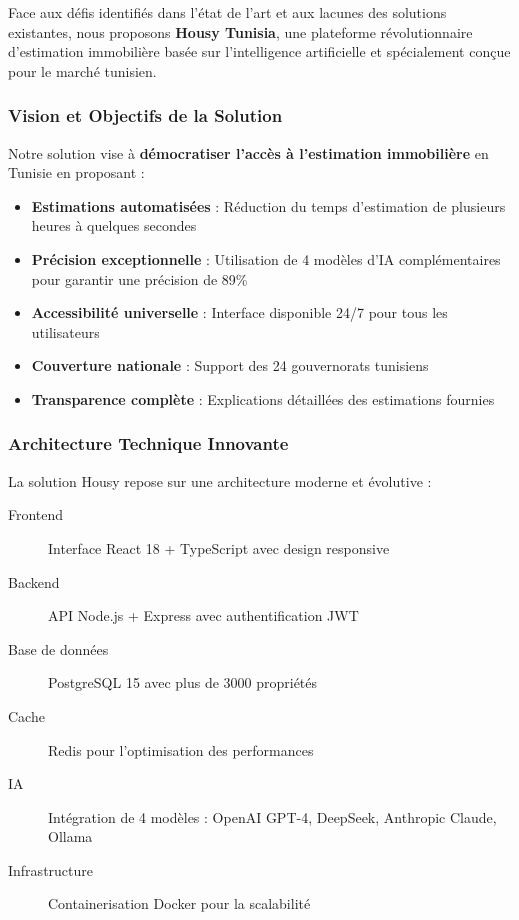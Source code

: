 Face aux défis identifiés dans l'état de l'art et aux lacunes des solutions existantes, nous proposons \textbf{Housy Tunisia}, une plateforme révolutionnaire d'estimation immobilière basée sur l'intelligence artificielle et spécialement conçue pour le marché tunisien.

\subsubsection{Vision et Objectifs de la Solution}

Notre solution vise à \textbf{démocratiser l'accès à l'estimation immobilière} en Tunisie en proposant :

\begin{itemize}
    \item \textbf{Estimations automatisées} : Réduction du temps d'estimation de plusieurs heures à quelques secondes
    \item \textbf{Précision exceptionnelle} : Utilisation de 4 modèles d'IA complémentaires pour garantir une précision de 89\%
    \item \textbf{Accessibilité universelle} : Interface disponible 24/7 pour tous les utilisateurs
    \item \textbf{Couverture nationale} : Support des 24 gouvernorats tunisiens
    \item \textbf{Transparence complète} : Explications détaillées des estimations fournies
\end{itemize}

\subsubsection{Architecture Technique Innovante}

La solution Housy repose sur une architecture moderne et évolutive :

\begin{description}
    \item[Frontend] Interface React 18 + TypeScript avec design responsive
    \item[Backend] API Node.js + Express avec authentification JWT
    \item[Base de données] PostgreSQL 15 avec plus de 3000 propriétés
    \item[Cache] Redis pour l'optimisation des performances
    \item[IA] Intégration de 4 modèles : OpenAI GPT-4, DeepSeek, Anthropic Claude, Ollama
    \item[Infrastructure] Containerisation Docker pour la scalabilité
\end{description}

